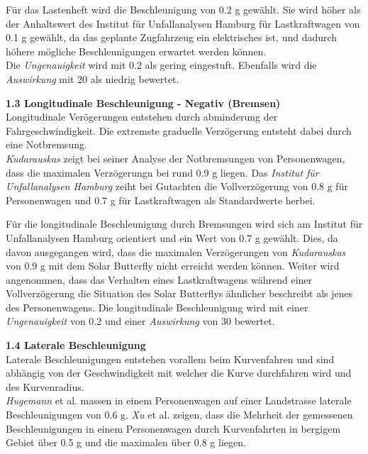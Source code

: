 \begin{description}
    Für das Lastenheft wird die Beschleunigung von 0.2 g gewählt. Sie wird höher als der Anhaltswert des Institut für Unfallanalysen Hamburg für Lastkraftwagen von 0.1 g gewählt, da das geplante Zugfahrzeug ein elektrisches ist, und dadurch höhere mögliche Beschleunigungen erwartet werden können.\\
    Die \emph{Ungenauigkeit} wird mit 0.2 als gering eingestuft. Ebenfalls wird die \emph{Auswirkung} mit 20 als niedrig bewertet.

    \item \textbf{1.3 Longitudinale Beschleunigung - Negativ (Bremsen)}\\
    Longitudinale Verögerungen entstehen durch abminderung der Fahrgeschwindigkeit. Die extremste graduelle Verzögerung entsteht dabei durch eine Notbremsung.\\
    \emph{Kudarauskas} \cite{Verz.1} zeigt bei seiner Analyse der Notbremsungen von Personenwagen, dass die maximalen Verzögerungn bei rund 0.9 g liegen. Das \emph{Institut für Unfallanalysen Hamburg} \cite{Verz.2} zeiht bei Gutachten die Vollverzögerung von 0.8 g für Personenwagen und 0.7 g für Lastkraftwagen als Standardwerte herbei.

    Für die longitudinale Beschleunigung durch Bremsungen wird sich am Institut für Unfallanalysen Hamburg orientiert und ein Wert von 0.7 g gewählt. Dies, da davon ausgegangen wird, dass die maximalen Verzögerungen von \emph{Kudarauskas} von 0.9 g mit dem Solar Butterfly nicht erreicht werden können. Weiter wird angenommen, dass das Verhalten eines Lastkraftwagens während einer Vollverzögerung die Situation des Solar Butterflys ähnlicher beschreibt als jenes des Personenwagens.
    Die longitudinale Beschleunigung wird mit einer \emph{Ungenauigkeit} von 0.2 und einer \emph{Auswirkung} von 30 bewertet.

    \item \textbf{1.4 Laterale Beschleunigung}\\
    Laterale Beschleunigungen entstehen vorallem beim Kurvenfahren und sind abhängig von der Geschwindigkeit mit welcher die Kurve durchfahren wird und des Kurvenradius.\\
    \emph{Hugemann} et al. \cite{Kurv.1} massen in einem Personenwagen auf einer Landstrasse laterale Beschleunigungen von 0.6 g. \emph{Xu} et al. \cite{Kurv.2} zeigen, dass die Mehrheit der gemessenen Beschleunigungen in einem Personenwagen durch Kurvenfahrten in bergigem Gebiet über 0.5 g und die maximalen über 0.8 g liegen.


\end{description}
